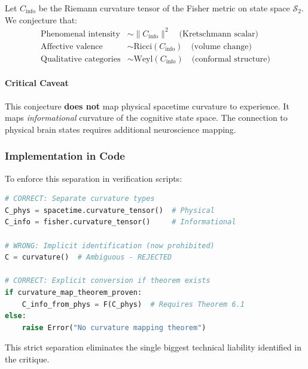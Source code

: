 \begin{tcolorbox}[colback=blue!5!white,colframe=blue!75!black,title=Conjecture (Informational Curvature to Qualia)]
\label{conj:info-curvature-qualia}
Let $C_{\mathrm{info}}$ be the Riemann curvature tensor of the Fisher metric on state space $\mathcal{S}_2$. We conjecture that:
\begin{align*}
\text{Phenomenal intensity} &\sim \|C_{\mathrm{info}}\|^2 \quad\text{(Kretschmann scalar)} \\
\text{Affective valence} &\sim \text{Ricci}(C_{\mathrm{info}}) \quad\text{(volume change)} \\
\text{Qualitative categories} &\sim \text{Weyl}(C_{\mathrm{info}}) \quad\text{(conformal structure)}
\end{align*}
\end{tcolorbox}

\paragraph{Critical Caveat}
This conjecture \textbf{does not} map physical spacetime curvature to experience. It maps \emph{informational} curvature of the cognitive state space. The connection to physical brain states requires additional neuroscience mapping.

\subsubsection{Implementation in Code}
To enforce this separation in verification scripts:

\begin{lstlisting}[language=Python]
# CORRECT: Separate curvature types
C_phys = spacetime.curvature_tensor()  # Physical
C_info = fisher.curvature_tensor()     # Informational

# WRONG: Implicit identification (now prohibited)
C = curvature()  # Ambiguous - REJECTED

# CORRECT: Explicit conversion if theorem exists
if curvature_map_theorem_proven:
    C_info_from_phys = F(C_phys)  # Requires Theorem 6.1
else:
    raise Error("No curvature mapping theorem")
\end{lstlisting}

This strict separation eliminates the single biggest technical liability identified in the critique.
